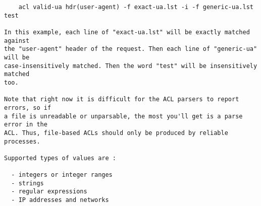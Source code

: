 \begin{verbatim}
    acl valid-ua hdr(user-agent) -f exact-ua.lst -i -f generic-ua.lst  test

In this example, each line of "exact-ua.lst" will be exactly matched against
the "user-agent" header of the request. Then each line of "generic-ua" will be
case-insensitively matched. Then the word "test" will be insensitively matched
too.

Note that right now it is difficult for the ACL parsers to report errors, so if
a file is unreadable or unparsable, the most you'll get is a parse error in the
ACL. Thus, file-based ACLs should only be produced by reliable processes.

Supported types of values are :

  - integers or integer ranges
  - strings
  - regular expressions
  - IP addresses and networks


\end{verbatim}
